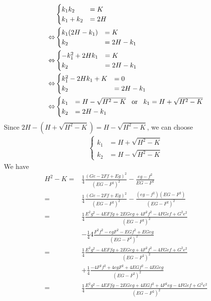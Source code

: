 \documentclass[a4paper]{report}
\begin{document}
\begin{align}
&\begin{cases}
k_1 k_2 &= K\\
k_1 + k_2 &= 2H
\end{cases}\\
\Leftrightarrow &
\begin{cases}
k_1 (2H - k_1) &= K\\
k_2 &= 2H - k_1
\end{cases}\\
\Leftrightarrow &
\begin{cases}
- k_1^2 + 2Hk_1 &= K\\
k_2 &= 2H - k_1
\end{cases}\\
\Leftrightarrow &
\begin{cases}
k_1^2 - 2Hk_1 + K &= 0\\
k_2 &= 2H - k_1
\end{cases}\\
\Leftrightarrow &
\begin{cases}
k_1 &= H - \sqrt{H^2 - K} \enskip \mbox{ or }\enskip k_1 = H + \sqrt{H^2 - K}\\
k_2 &= 2H - k_1 
\end{cases}
\end{align}
Since $2H - (H + \sqrt{H^2 - K} )  = H - \sqrt{H^2 - K}$, we can choose
\begin{align}
	\begin{cases}
	k_1 &= H + \sqrt{H^2 - K}\\
	k_2 &= H - \sqrt{H^2 - K}
	\end{cases}
\end{align}
We have
\begin{align}
	H^2 - K =& \frac{1}{4} \frac{(Ge - 2Ff + Eg)^2}{(EG - F^2)^2} - \frac{eg - f^2}{EG - F^2}\\
	=& \frac{1}{4} \frac{(Ge - 2Ff + Eg)^2}{(EG - F^2)^2} - \frac{(eg - f^2)(EG - F^2)}{(EG - F^2)^2}\\
	=& \frac{1}{4} \frac{E^2g^2 - 4EFfg + 2EGeg + 4F^2f^2 - 4FGef + G^2e^2}{(EG - F^2)^2}\\
	&- \frac{1}{4} 4\frac{F^2f^2 - egF^2 - EGf^2 + EGeg}{(EG - F^2)^2}\\
	=& \frac{1}{4} \frac{E^2g^2 - 4EFfg + 2EGeg + 4F^2f^2 - 4FGef + G^2e^2}{(EG - F^2)^2}\\
	&+ \frac{1}{4} \frac{-4F^2f^2 + 4egF^2 + 4EGf^2 - 4EGeg}{(EG - F^2)^2}\\
	=& \frac{1}{4} \frac{E^2g^2 - 4EFfg - 2EGeg + 4EGf^2 + 4F^2eg - 4FGef + G^2e^2}{(EG - F^2)^2}\\
\end{align}
\end{document}
